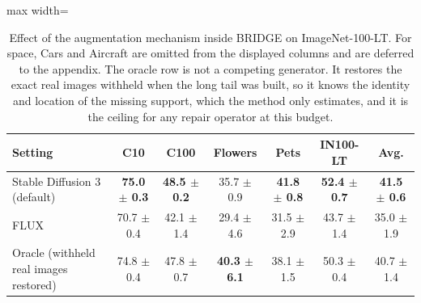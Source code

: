 \begin{table}[t]
\centering
\scriptsize
\setlength{\tabcolsep}{3.5pt}
\caption{Effect of the augmentation mechanism inside BRIDGE on ImageNet-100-LT. For space, Cars and Aircraft are omitted from the displayed columns and are deferred to the appendix. The oracle row is not a competing generator. It restores the exact real images withheld when the long tail was built, so it knows the identity and location of the missing support, which the method only estimates, and it is the ceiling for any repair operator at this budget.}
\label{tab:main_ablation_generation}
\begin{adjustbox}{max width=\textwidth}
\begin{tabular}{l c c c c c c}
\toprule
Setting & C10 & C100 & Flowers & Pets & IN100-LT & Avg. \\
\midrule
Stable Diffusion 3 (default) & \textbf{75.0 {\scriptsize$\pm$ 0.3}} & \textbf{48.5 {\scriptsize$\pm$ 0.2}} & 35.7 {\scriptsize$\pm$ 0.9} & \textbf{41.8 {\scriptsize$\pm$ 0.8}} & \textbf{52.4 {\scriptsize$\pm$ 0.7}} & \textbf{41.5 {\scriptsize$\pm$ 0.6}} \\
FLUX & 70.7 {\scriptsize$\pm$ 0.4} & 42.1 {\scriptsize$\pm$ 1.4} & 29.4 {\scriptsize$\pm$ 4.6} & 31.5 {\scriptsize$\pm$ 2.9} & 43.7 {\scriptsize$\pm$ 1.4} & 35.0 {\scriptsize$\pm$ 1.9} \\
Oracle (withheld real images restored) & 74.8 {\scriptsize$\pm$ 0.4} & 47.8 {\scriptsize$\pm$ 0.7} & \textbf{40.3 {\scriptsize$\pm$ 6.1}} & 38.1 {\scriptsize$\pm$ 1.5} & 50.3 {\scriptsize$\pm$ 0.4} & 40.7 {\scriptsize$\pm$ 1.4} \\
\bottomrule
\end{tabular}
\end{adjustbox}
\end{table}
